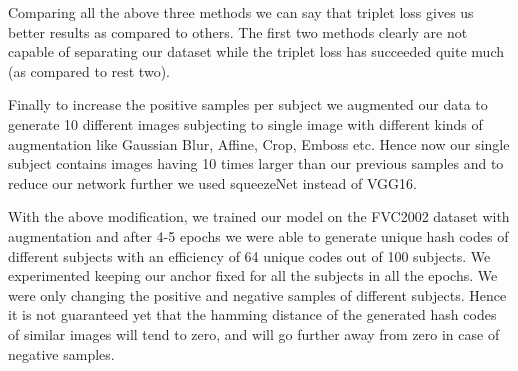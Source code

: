 Comparing all the above three methods we can say that triplet loss gives us better results as compared to others. The first two methods clearly are not capable of separating our dataset while the triplet loss has succeeded quite much (as compared to rest two).

Finally to increase the positive samples per subject we augmented our data to generate 10 different images subjecting to single image with different kinds of augmentation like Gaussian Blur, Affine, Crop, Emboss etc. Hence now our single subject contains images having 10 times larger than our previous samples and to reduce our network further we used squeezeNet \cite{Iandola2016SqueezeNetAA} instead of VGG16.

With the above modification, we trained our model on the FVC2002 dataset with augmentation and after 4-5 epochs we were able to generate unique hash codes of different subjects with an efficiency of 64 unique codes out of 100 subjects. We experimented keeping our anchor fixed for all the subjects in all the epochs. We were only changing the positive and negative samples of different subjects. Hence it is not guaranteed yet that the  hamming distance of the  generated hash codes of similar images will tend to zero, and will go further away from zero in case of negative samples.

